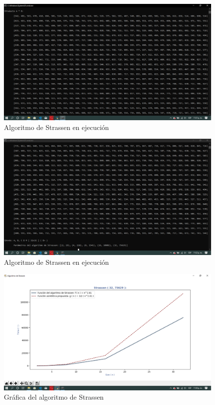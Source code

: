 \documentclass[12pt,twoside]{article}
\begin{document}
\begin{figure}[H]
    \centering
    \includegraphics[scale=0.35]{strassen3.png}
    \caption{Algoritmo de Strassen en ejecuci\'on}
    \label{fig:strassen_exec}
\end{figure}
\begin{figure}[H]
    \centering
    \includegraphics[scale=0.35]{strassen4.png}
    \caption{Algoritmo de Strassen en ejecuci\'on}
    \label{fig:strassen_exec}
\end{figure}
\begin{figure}[H]
    \centering
    \includegraphics[scale=0.35]{strassen5.png}
    \caption{Gr\'afica del algoritmo de Strassen}
    \label{fig:strassen_graph}
\end{figure}
\end{document}
